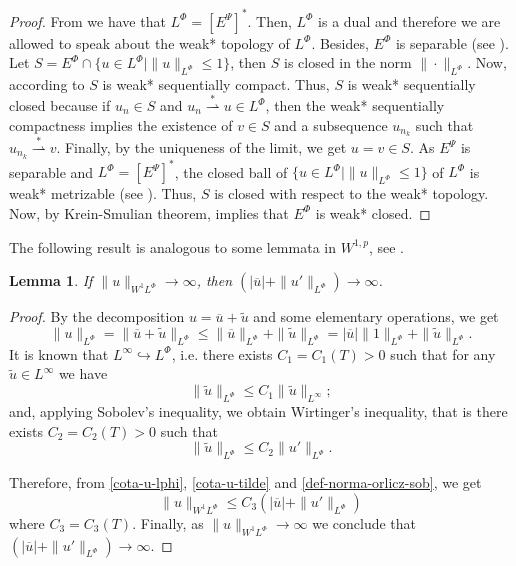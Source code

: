 \documentclass[twoside]{article}
\newtheorem{lem}[thm]{Lemma}
\theoremstyle{remark}
\newcommand{\orlnor}{\|_{L^{\Phi}}}
\newcommand{\lphi}{L^{\Phi}}
\newcommand{\ephi}{E^{\Phi}}
\newcommand{\sobnor}{\|_{W^{1}\lphi}}
\renewcommand{\leq}{\leqslant}
\newcommand{\epsi}{E^{\Psi}}
\begin{document}
\begin{proof}
From \cite[Thm. 7, p. 110]{rao1991theory} we have that $\lphi=\left[\epsi\right]^*
$.
Then, $\lphi$ is a dual and therefore we are allowed to speak about the weak* topology of $\lphi$.
Besides, $\ephi
$ is separable (see \cite[Thm. 1, p. 87]{rao1991theory}).
Let $S=\ephi\cap \{u \in \lphi|\|u\orlnor\leq 1\}$, then $S$ is closed in the norm $\|\cdot\orlnor$. 
Now, according to \cite[Cor. 5, p. 148]{rao1991theory} $S$ is weak* sequentially compact. 
Thus, $S$ is weak* sequentially closed because if $u_n\in S$ and
$u_n \overset{*}{\rightharpoonup}u \in \lphi$, then  the weak* sequentially compactness implies the existence of $v \in S$ and a subsequence $u_{n_k}$ such that
$u_{n_k}\overset{*}{\rightharpoonup}v$. Finally, by the uniqueness of   the limit, we get
$u=v\in S$.
As $\epsi$ is separable and $\lphi=\left[\epsi\right]^*$, the closed ball of $\{u \in \lphi | \|u\orlnor\leq 1\}$ of $\lphi$  is  weak* metrizable (see \cite[Thm. 5.1, p. 138]{Conway1977}).
Thus, $S$ is closed with respect to  the weak* topology. Now, by  Krein-Smulian theorem, \cite[Cor. 12.6, p. 165]{Conway1977} implies that $\ephi$ is weak* closed.
\end{proof}

The following result is analogous to some lemmata in $W^{1,p}$, see \cite{xu2007some}.
\begin{lem}\label{infinito-a-prom-upunto}
If $\|u\sobnor\to \infty$, then $(|\overline{u}|+\|u'\orlnor)\to \infty$.
\end{lem}

\begin{proof}
By the decomposition $u=\overline{u}+\tilde{u}$ and some elementary operations,
we get
\begin{equation}\label{cota-u-lphi}
\|u\orlnor=
\|\overline{u}+\tilde{u}\orlnor\leq
\|\overline{u}\orlnor+\|\tilde{u}\orlnor=
|\overline{u}|\|1\orlnor+\|\tilde{u}\orlnor.
\end{equation}
It is known that $L^{\infty}\hookrightarrow\lphi$, i.e.
there exists $C_1=C_1(T)>0$ such that for any $\tilde{u}\in L^{\infty}$ we have
\[
\|\tilde{u}\orlnor
\leq
C_1 \|\tilde{u}\|_{L^{\infty}};
\]
and, applying  Sobolev's inequality,  we obtain Wirtinger's inequality, 
that is there exists $C_2=C_2(T)>0$ such that
\begin{equation}\label{cota-u-tilde}
\|\tilde{u}\orlnor
\leq
C_2\|u'\orlnor.
\end{equation}

Therefore, from \eqref{cota-u-lphi}, \eqref{cota-u-tilde} and \eqref{def-norma-orlicz-sob},
we get
\[
\|u\sobnor\leq
C_3(|\overline{u}|+\|u'\orlnor)
\]
where $C_3=C_3(T)$. Finally, as $\|u\sobnor\to \infty$ we conclude that
$(|\overline{u}|+\|u'\orlnor)\to \infty$.
\end{proof}
\end{document}
